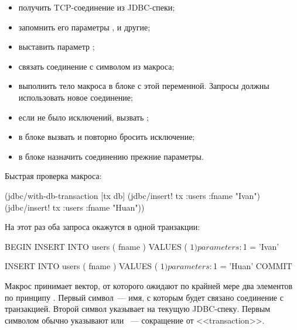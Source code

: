 \begin{itemize}

\item
  получить TCP-соединение из JDBC-спеки;

\item
  запомнить его параметры ,  и другие;

\item
  выставить параметр ;

\item
  связать соединение с символом из макроса;

\item
  выполнить тело макроса в блоке  с этой переменной. Запросы должны использовать новое соединение;

\item
  если не было исключений, вызвать ;

\item
  в блоке  вызвать  и повторно бросить исключение;

\item
  в блоке  назначить соединению прежние параметры.

\end{itemize}

Быстрая проверка макроса:

\begin{english}
  \begin{clojure}
(jdbc/with-db-transaction [tx db]
  (jdbc/insert! tx :users {:fname "Ivan"})
  (jdbc/insert! tx :users {:fname "Huan"}))
  \end{clojure}
\end{english}

На этот раз оба запроса окажутся в одной транзакции:

\begin{english}
  \begin{sql}
BEGIN
INSERT INTO users ( fname ) VALUES ( $1 )
parameters: $1 = 'Ivan'

INSERT INTO users ( fname ) VALUES ( $1 )
parameters: $1 = 'Huan'
COMMIT
  \end{sql}
\end{english}

Макрос принимает вектор, от которого ожидают по крайней мере два элементов по принципу . Первый символ~--- имя, с которым будет связано соединение с транзакцией. Второй символ указывает на текущую JDBC-спеку. Первым символом обычно указывают  или ~--- сокращение от <<transaction>>.


